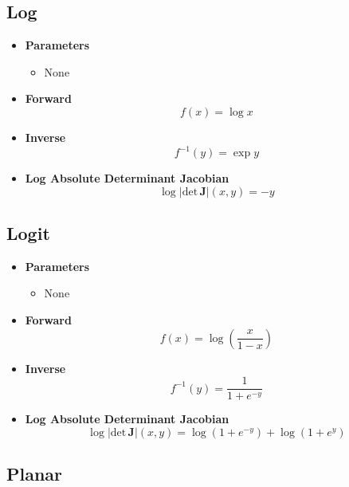 \documentclass{article}
\begin{document}
\subsection{Log}
\begin{itemize}
  \item \textbf{Parameters}
  \begin{itemize}
    \item None
  \end{itemize}
  \item \textbf{Forward}
  \begin{equation}
    f(x) = \log x
  \end{equation}
  \item \textbf{Inverse}
  \begin{equation}
    f^{-1}(y) = \exp y
  \end{equation}
  \item \textbf{Log Absolute Determinant Jacobian}
  \begin{equation}
    \log \vert \text{det} \, \mathbf{J} \vert (x, y) = - y
  \end{equation}
\end{itemize}
\subsection{Logit}
\begin{itemize}
  \item \textbf{Parameters}
  \begin{itemize}
    \item None
  \end{itemize}
  \item \textbf{Forward}
  \begin{equation}
    f(x) = \log \left( \frac{x}{1 - x} \right)
  \end{equation}
  \item \textbf{Inverse}
  \begin{equation}
    f^{-1}(y) = \frac{1}{1 + e^{-y}}
  \end{equation}
  \item \textbf{Log Absolute Determinant Jacobian}
  \begin{equation}
    \log \vert \text{det} \, \mathbf{J} \vert (x, y) = \log\left( 1 + e^{-y} \right) + \log\left( 1 + e^{y} \right)
  \end{equation}
\end{itemize}

\subsection{Planar}
\end{document}
